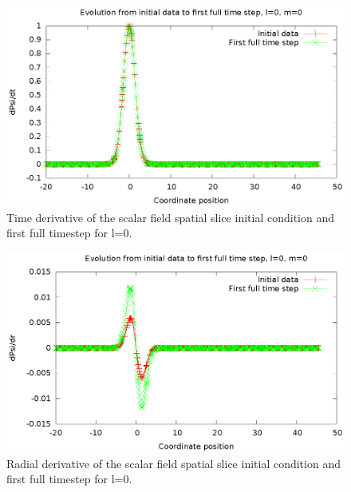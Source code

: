 \begin{figure}
  \includegraphics{rho1dl0}
  \caption{Time derivative of the scalar field spatial slice initial condition and first full timestep for l=0.}
\end{figure}

\begin{figure}
  \includegraphics{phi1dl0}
  \caption{Radial derivative of the scalar field spatial slice initial condition and first full timestep for l=0.}
\end{figure}
